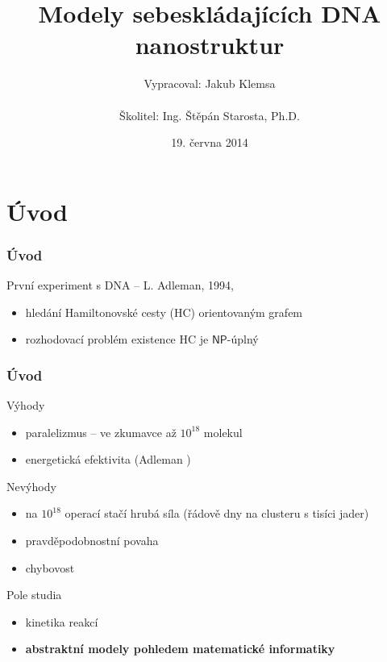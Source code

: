 \documentclass[10pt]{beamer}
\title{Modely sebeskládajících DNA nanostruktur}
\institute
{
	Fakulta jaderná a fyzikálně inženýrská\\
	Matematická informatika
}
\author{Vypracoval: Jakub Klemsa\\
	~\\
	Školitel: Ing. Štěpán Starosta, Ph.D.}
\date{19. června 2014}
\newcommand{\NP}{\mathsf{NP}}
\theoremstyle{definition}
\theoremstyle{remark}
\begin{document}
\begin{frame}
	\titlepage
\end{frame}

\begin{frame}
	\tableofcontents
\end{frame}


\section{Úvod}
\begin{frame}
\frametitle{Úvod}
	První experiment s DNA -- L. Adleman, 1994, \cite{adleman94}
	\begin{itemize}
		\item hledání Hamiltonovské cesty (HC) orientovaným grafem
		\item rozhodovací problém existence HC je $\NP$-úplný
	\end{itemize}
\end{frame}

\begin{frame}
\frametitle{Úvod}
	Výhody
	\begin{itemize}
		\item paralelizmus -- ve zkumavce až $10^{18}$  molekul
		\item energetická efektivita (Adleman \cite{adleman94})
	\end{itemize}
	\pause
	Nevýhody
	\begin{itemize}
		\item na $10^{18}$ operací stačí hrubá síla (řádově dny na clusteru s tisíci jader)
		\item pravděpodobnostní povaha
		\item chybovost
	\end{itemize}
	\pause
	Pole studia
	\begin{itemize}
		\item kinetika reakcí
		\item {\bf abstraktní modely pohledem matematické informatiky}
	\end{itemize}
\end{frame}
\end{document}

